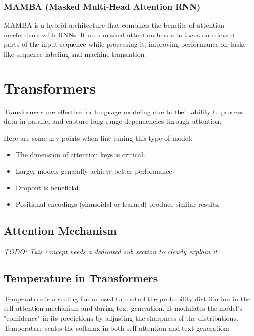 \documentclass{article}
\begin{document}
\subsubsection{MAMBA (Masked Multi-Head Attention RNN)}
MAMBA is a hybrid architecture that combines the benefits of attention mechanisms with RNNs. It uses masked attention heads to focus on relevant parts of the input sequence while processing it, improving performance on tasks like sequence labeling and machine translation.




\clearpage\newpage

\section{Transformers} \label{sec:transformers}
Transformers are effective for language modeling due to their ability to process data in parallel and capture long-range dependencies through attention.

Here are some key points when fine-tuning this type of model:
\begin{itemize}
    \item The dimension of attention keys is critical.
    \item Larger models generally achieve better performance.
    \item Dropout is beneficial.
    \item Positional encodings (sinusoidal or learned) produce similar results.
\end{itemize}

\subsection{Attention Mechanism}
\textit{TODO: This concept needs a dedicated sub section to clearly explain it}

\subsection{Temperature in Transformers}
Temperature is a scaling factor used to control the probability distribution in the self-attention mechanism and during text generation. It modulates the model’s "confidence" in its predictions by adjusting the sharpness of the distributions. Temperature scales the softmax in both self-attention and text generation:
\end{document}
